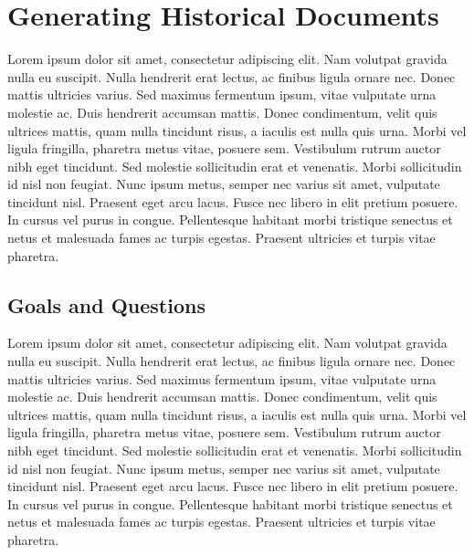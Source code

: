 \chapter{Generating Historical Documents}

Lorem ipsum dolor sit amet, consectetur adipiscing elit. Nam volutpat gravida nulla eu suscipit. Nulla hendrerit erat lectus, ac finibus ligula ornare nec. Donec mattis ultricies varius. Sed maximus fermentum ipsum, vitae vulputate urna molestie ac. Duis hendrerit accumsan mattis. Donec condimentum, velit quis ultrices mattis, quam nulla tincidunt risus, a iaculis est nulla quis urna. Morbi vel ligula fringilla, pharetra metus vitae, posuere sem. Vestibulum rutrum auctor nibh eget tincidunt. Sed molestie sollicitudin erat et venenatis. Morbi sollicitudin id nisl non feugiat. Nunc ipsum metus, semper nec varius sit amet, vulputate tincidunt nisl. Praesent eget arcu lacus. Fusce nec libero in elit pretium posuere. In cursus vel purus in congue. Pellentesque habitant morbi tristique senectus et netus et malesuada fames ac turpis egestas. Praesent ultricies et turpis vitae pharetra.

\section{Goals and Questions}
Lorem ipsum dolor sit amet, consectetur adipiscing elit. Nam volutpat gravida nulla eu suscipit. Nulla hendrerit erat lectus, ac finibus ligula ornare nec. Donec mattis ultricies varius. Sed maximus fermentum ipsum, vitae vulputate urna molestie ac. Duis hendrerit accumsan mattis. Donec condimentum, velit quis ultrices mattis, quam nulla tincidunt risus, a iaculis est nulla quis urna. Morbi vel ligula fringilla, pharetra metus vitae, posuere sem. Vestibulum rutrum auctor nibh eget tincidunt. Sed molestie sollicitudin erat et venenatis. Morbi sollicitudin id nisl non feugiat. Nunc ipsum metus, semper nec varius sit amet, vulputate tincidunt nisl. Praesent eget arcu lacus. Fusce nec libero in elit pretium posuere. In cursus vel purus in congue. Pellentesque habitant morbi tristique senectus et netus et malesuada fames ac turpis egestas. Praesent ultricies et turpis vitae pharetra.

